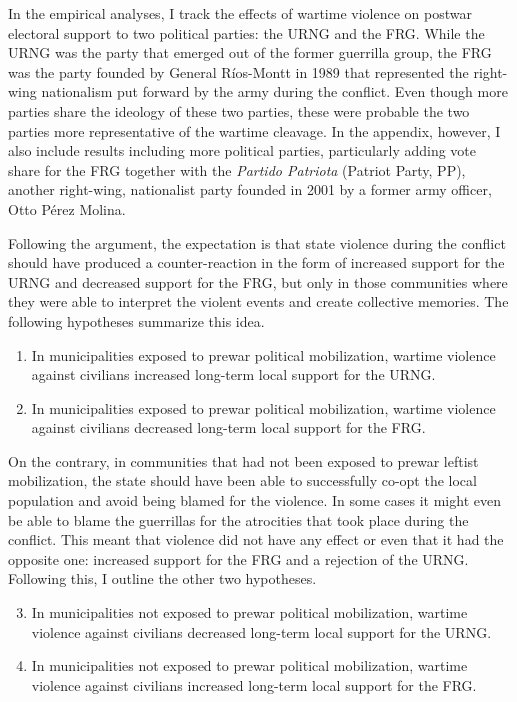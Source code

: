 \documentclass[12pt, notitlepage]{article}
\begin{document}
In the empirical analyses, I track the effects of wartime violence on postwar electoral support to two political parties: the URNG and the FRG.
While the URNG was the party that emerged out of the former guerrilla group, the FRG was the party founded by General Ríos-Montt in 1989 that represented the right-wing nationalism put forward by the army during the conflict.
Even though more parties share the ideology of these two parties, these were probable the two parties more representative of the wartime cleavage.
In the appendix, however, I also include results including more political parties, particularly adding vote share for the FRG together with the \textit{Partido Patriota} (Patriot Party, PP), another right-wing, nationalist party founded in 2001 by a former army officer, Otto Pérez Molina.

Following the argument, the expectation is that state violence during the conflict should have produced a counter-reaction in the form of increased support for the URNG and decreased support for the FRG, but only in those communities where they were able to interpret the violent events and create collective memories.
The following hypotheses summarize this idea.

\begin{enumerate}[label={\bf H\arabic*:} , ref=H\arabic* , wide=0.5em, leftmargin=*]
  \item \label{h:URNG-mob} In municipalities exposed to prewar political mobilization, wartime violence against civilians increased long-term local support for the URNG.
  \item \label{h:FRG-mob} In municipalities exposed to prewar political mobilization, wartime violence against civilians decreased long-term local support for the FRG.
\end{enumerate}

On the contrary, in communities that had not been exposed to prewar leftist mobilization, the state should have been able to successfully co-opt the local population and avoid being blamed for the violence.
In some cases it might even be able to blame the guerrillas for the atrocities that took place during the conflict.
This meant that violence did not have any effect or even that it had the opposite one: increased support for the FRG and a rejection of the URNG.
Following this, I outline the other two hypotheses.

\begin{enumerate}[label={\bf H\arabic*:} , ref=H\arabic* , wide=0.5em, leftmargin=*]
  \setcounter{enumi}{2}
  \item \label{h:URNG-no-mob} In municipalities not exposed to prewar political mobilization, wartime violence against civilians decreased long-term local support for the URNG.
  \item \label{h:FRG-no-mob} In municipalities not exposed to prewar political mobilization, wartime violence against civilians increased long-term local support for the FRG.
\end{enumerate}
\end{document}
